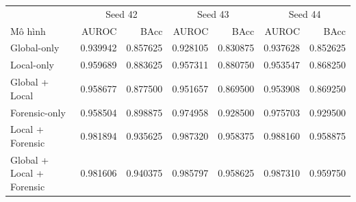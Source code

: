 \scriptsize
\begin{tabular}{lrrrrrr}
\toprule
 & \multicolumn{2}{c}{Seed 42} & \multicolumn{2}{c}{Seed 43} & \multicolumn{2}{c}{Seed 44} \\
Mô hình & AUROC & BAcc & AUROC & BAcc & AUROC & BAcc \\
\midrule
Global-only & 0.939942 & 0.857625 & 0.928105 & 0.830875 & 0.937628 & 0.852625 \\
Local-only & 0.959689 & 0.883625 & 0.957311 & 0.880750 & 0.953547 & 0.868250 \\
Global + Local & 0.958677 & 0.877500 & 0.951657 & 0.869500 & 0.953908 & 0.869250 \\
Forensic-only & 0.958504 & 0.898875 & 0.974958 & 0.928500 & 0.975703 & 0.929500 \\
Local + Forensic & 0.981894 & 0.935625 & 0.987320 & 0.958375 & 0.988160 & 0.958875 \\
Global + Local + Forensic & 0.981606 & 0.940375 & 0.985797 & 0.958625 & 0.987310 & 0.959750 \\
\bottomrule
\end{tabular}
